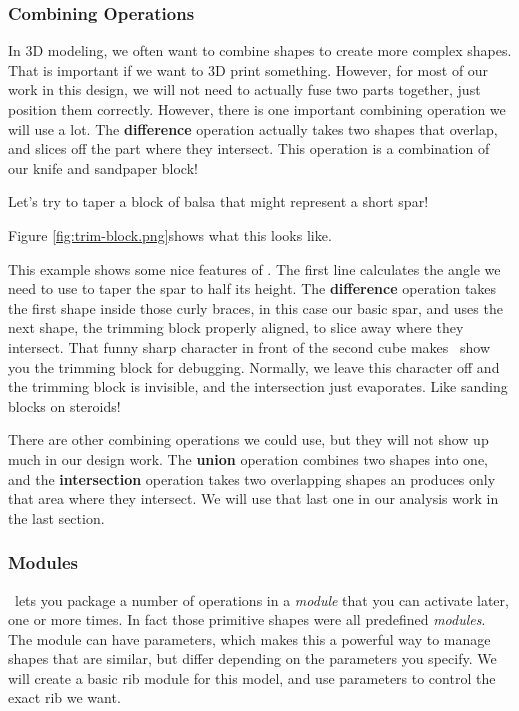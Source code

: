 \subsubsection{Combining Operations}

In 3D modeling, we often want to combine shapes to create more complex shapes.
That is important if we want to 3D print something. However, for most of our
work in this design, we will not need to actually fuse two parts together, just
position them correctly. However, there is one important combining operation we
will use a lot. The {\bf difference} operation actually takes two shapes that
overlap, and slices off the part where they intersect. This operation is a
combination of our knife and sandpaper block!

Let's try to taper a block of balsa that might represent a short spar!


Figure \ref{fig:trim-block.png}shows what this looks like.



This example shows some nice features of \osc. The first line calculates the
angle we need to use to taper  the spar to half its height. The {\bf
difference} operation takes the first shape inside those curly braces, in this
case our basic spar, and uses the next shape, the trimming block properly
aligned, to slice away where they intersect. That funny sharp character in front
of the second cube makes \osc\ show you the trimming block for debugging.
Normally, we leave this character off and the trimming block is invisible, and
the intersection just evaporates.
Like sanding blocks on steroids!

There are other combining operations we could use, but they will not show up
much in our design work. The {\bf union} operation combines two shapes into
one, and the {\bf intersection} operation takes two overlapping shapes an
produces only that area where they intersect. We will use that last one in our
analysis work in the last section.

\subsubsection{Modules}

\osc\ lets you package a number of operations in a {\it module} that you can
activate later, one or more times. In fact those primitive shapes were all
predefined {\it modules}. The module can have parameters, which makes this a
powerful way to manage shapes that are similar, but differ depending on the
parameters you specify.  We will create a basic rib module for this model, and
use parameters to control the exact rib we want.

